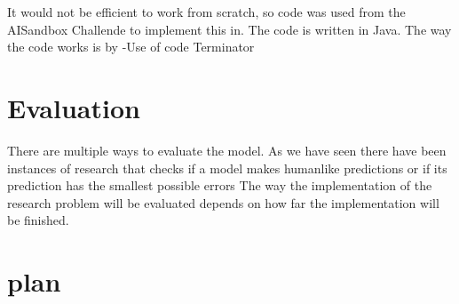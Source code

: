 \documentclass[a4paper, 12pt]{article}
\begin{document}
It would not be efficient to work from scratch, so code was used from the
AISandbox Challende to implement this in. The code is written in Java. The way
the code works is by 
-Use of code Terminator

\section{Evaluation}
There are multiple ways to evaluate the model. As we have seen there have been
instances of research that checks if a model makes humanlike predictions %
or if its prediction has the smallest possible errors %
The way the implementation of the research problem will be evaluated depends on
how far the implementation will be finished.

\section{plan}



\end{document}
